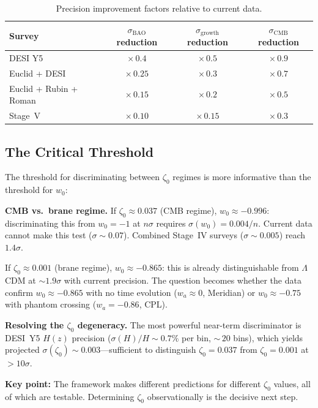 \begin{table}[htbp]
\centering
\caption{Precision improvement factors relative to current data.}
\label{tab:2-Fisher-improve}
\begin{tabular}{lccc}
\toprule
Survey & $\sigma_\mathrm{BAO}$ reduction & $\sigma_\mathrm{growth}$ reduction & $\sigma_\mathrm{CMB}$ reduction \\
\midrule
DESI Y5 & $\times\,0.4$ & $\times\,0.5$ & $\times\,0.9$ \\
Euclid + DESI & $\times\,0.25$ & $\times\,0.3$ & $\times\,0.7$ \\
Euclid + Rubin + Roman & $\times\,0.15$ & $\times\,0.2$ & $\times\,0.5$ \\
Stage~V & $\times\,0.10$ & $\times\,0.15$ & $\times\,0.3$ \\
\bottomrule
\end{tabular}
\end{table}

\subsection{The Critical Threshold}
\label{sec:2-Fisher-threshold}

The threshold for discriminating between $\zeta_0$ regimes is more informative than the threshold for $w_0$:

\textbf{CMB vs.\ brane regime.} If $\zeta_0 \approx 0.037$ (CMB regime), $w_0 \approx -0.996$: discriminating this from $w_0 = -1$ at $n\sigma$ requires $\sigma(w_0) = 0.004/n$. Current data cannot make this test ($\sigma \sim 0.07$). Combined Stage~IV surveys ($\sigma \sim 0.005$) reach $1.4\sigma$.

If $\zeta_0 \approx 0.001$ (brane regime), $w_0 \approx -0.865$: this is already distinguishable from $\Lambda$CDM at $\sim 1.9\sigma$ with current precision. The question becomes whether the data confirm $w_0 \approx -0.865$ with no time evolution ($w_a \approx 0$, Meridian) or $w_0 \approx -0.75$ with phantom crossing ($w_a = -0.86$, CPL).

\textbf{Resolving the $\zeta_0$ degeneracy.} The most powerful near-term discriminator is DESI~Y5 $H(z)$ precision ($\sigma(H)/H \sim 0.7\%$ per bin, ${\sim}\,20$ bins), which yields projected $\sigma(\zeta_0) \sim 0.003$---sufficient to distinguish $\zeta_0 = 0.037$ from $\zeta_0 = 0.001$ at $> 10\sigma$.

\textbf{Key point:} The framework makes different predictions for different $\zeta_0$ values, all of which are testable. Determining $\zeta_0$ observationally is the decisive next step.

